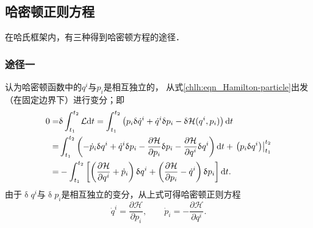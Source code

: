 \subsection{哈密顿正则方程}
在哈氏框架内，有三种得到哈密顿方程的途径． %

\subsubsection{途径一}
认为哈密顿函数中的$q^i$与$p_i$是相互独立的，
从式\eqref{chlh:eqn_Hamilton-particle}出发（在固定边界下）进行变分；即
\begin{align*}
    0=& \updelta \int_{t_1}^{t_2} \mathcal{L} {\rm d}t 
    = \int_{t_1}^{t_2} \left( p_i \updelta \dot{q}^i +  \dot{q}^i\updelta  p_i
    - \updelta \mathcal{H}(q^i,p_i) \right){\rm d}t \\
    =& \int_{t_1}^{t_2} \left( - \dot{p}_i \updelta q^i +  \dot{q}^i\updelta  p_i
    - \frac{\partial \mathcal{H}}{\partial p_i }\updelta p_i
    - \frac{\partial \mathcal{H}}{\partial q^i }\updelta q^i \right){\rm d}t 
    + \left. \left( p_i  \updelta q^i\right)\right|_{t_1}^{t_2} \\
    =&-\int_{t_1}^{t_2} \left[ \left(\frac{\partial \mathcal{H}}{\partial q^i } +\dot{p}_i \right)\updelta q^i
    +\left(\frac{\partial \mathcal{H}}{\partial p_i }-\dot{q}^i \right)\updelta p_i \right] {\rm d}t .
\end{align*}
由于$\updelta q^i$与$\updelta p_i$是相互独立的变分，从上式可得哈密顿正则方程 %
\begin{equation}\label{chlh:eqn_hamiltion}
    \dot{q}^i = \frac{\partial \mathcal{H}}{\partial p_i }, \qquad
    \dot{p}_i = - \frac{\partial \mathcal{H}}{\partial q^i } .
\end{equation}


